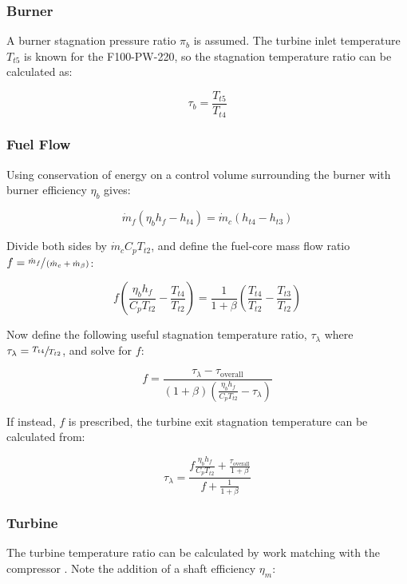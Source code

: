 \documentclass{article}
\begin{document}
\subsubsection{Burner}
A burner stagnation pressure ratio $\pi_b$ is assumed. The turbine inlet temperature $T_{t5}$ is known for the F100-PW-220, so the stagnation temperature ratio can be calculated as:

\begin{equation*}
\tau_b = \frac{T_{t5}}{T_{t4}}
\end{equation*}

\subsubsection{Fuel Flow}

Using conservation of energy on a control volume surrounding the burner with burner efficiency $\eta_b$ gives:

\begin{equation*}
\dot{m}_f (\eta_b h_f - h_{t4}) = \dot{m}_c ( h_{t4} - h_{t3})
\end{equation*}

Divide both sides by $\dot{m}_c C_p T_{t2}$, and define the fuel-core mass flow ratio $f = \sfrac{\dot{m}_f}{\left( \dot{m}_c + \dot{m}_{\beta} \right)}$:

\begin{equation*}
f \left( \frac{\eta_b h_f}{C_p T_{t2}} - \frac{T_{t4}}{T_{t2}} \right) = \frac{1}{1 + \beta} \left( \frac{T_{t4}}{T_{t2}} - \frac{T_{t3}}{T_{t2}} \right)
\end{equation*}

Now define the following useful stagnation temperature ratio, $\tau_{\lambda}$ where $\tau_{\lambda} = \sfrac{T_{t4}}{T_{t2}}$, and solve for $f$:

\begin{equation*}
f = \frac{\tau_{\lambda} - \tau_{\textrm{overall}}}{ \left( 1 + \beta \right) \left( \frac{ \eta_b h_f}{C_p T_{t2}} - \tau_{\lambda} \right) }
\end{equation*}

If instead, $f$ is prescribed, the turbine exit stagnation temperature can be calculated from:

\begin{equation*}
\tau_{\lambda} = \frac{ f \frac{\eta_b h_f}{C_p T_{t2}} + \frac{\tau_{\textrm{overall}}}{1 + \beta}}{f + \frac{1}{1 + \beta}}
\end{equation*}

\subsubsection{Turbine}
The turbine temperature ratio can be calculated by work matching with the compressor \cite{cantwell283}. Note the addition of a shaft efficiency $\eta_m$:
\end{document}

